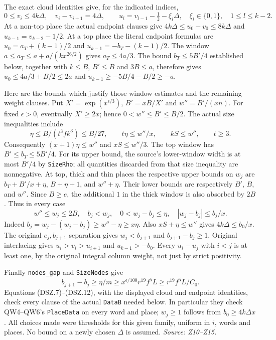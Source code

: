 The exact cloud identities give, for the indicated indices,
\[
 0\le v_i\le4k\Delta,\quad v_i-v_{i+1}=4\Delta,
 \qquad u_l=v_{l-1}-\tfrac12-\xi_l\Delta,
 \quad \xi_l\in\{0,1\},\quad1\le l\le k-2.                 \tag{DSZ.9}
\]
At a non-top place the actual endpoint clauses give
$4k\Delta\le u_0-v_0\le8k\Delta$ and
$u_{k-1}=v_{k-2}-1/2$. At a top place the literal endpoint formulas
are $u_0=a_T+(k-1)/2$ and $u_{k-1}=-b_T-(k-1)/2$.
The window $a\le a_T\le a+a/(kx^{26/2})$ gives
$a_T\le4a/3$. The bound $b_T\le5B'/4$ established below,
together with $k\le B$, $B'\le B$ and $3B\le a$, therefore gives
$u_0\le4a/3+B/2\le2a$ and
$u_{k-1}\ge-5B/4-B/2\ge-a$.

Here are the bounds which justify those window estimates and the
remaining weight clauses. Put
$X'=\exp(x^{\epsilon/3})$, $B'=xB/X'$ and $w''=B'/(xn)$.
For fixed $\epsilon>0$, eventually $X'\ge2x$; hence
$0<w''\le B'\le B/2$.
The actual size inequalities include
\[
 \eta\le B/(t^3fk^3)\le B/27,\qquad
 t\eta\le w''/x,\qquad kS\le w'',\qquad t\ge3.
                                                               \tag{DSZ.10}
\]
Consequently $(x+1)\eta\le w''$ and $xS\le w''/3$.
The top window has $B'\le b_T\le5B'/4$.
For its upper bound, the source's lower-window width is at most
$B'/4$ by \texttt{SizeRho}; all quantities discarded from that
size inequality are nonnegative. At top, thick and thin places
the respective upper bounds on $w_j$ are
$b_T+B'/x+\eta$, $B+\eta+1$, and $w''+\eta$.
Their lower bounds are respectively $B'$, $B$, and $w''$.
Since $B\ge e$, the additional $1$ in the thick window is also
absorbed by $2B$. Thus in every case
\[
 w''\le w_j\le2B,\quad b_j<w_j,\quad0<w_j-b_j\le\eta,
 \quad |w_j-b_j|\le b_j/x.                                    \tag{DSZ.11}
\]
Indeed $b_j=w_j-(w_j-b_j)\ge w''-\eta\ge x\eta$.
Also $xS+\eta\le w''$ gives $4k\Delta\le b_0/x$.
The original $e_j,b_{j+1}$ separation gives $w_j<b_{j+1}$ and
$b_{j+1}-b_j\ge1$. Original interlacing gives
$u_i>v_i>u_{i+1}$ and $u_{k-1}>-b_0$.
Every $u_i-u_j$ with $i<j$ is at least one, by the original
integral column weight, not just by strict positivity.

Finally \texttt{nodes\_gap} and \texttt{SizeNodes} give
\[
 b_{j+1}-b_j\ge\eta/m
       \ge x^{\epsilon/100}r^{19}f^5L
       \ge r^{19}f^5L/C_0.                                   \tag{DSZ.12}
\]
Equations (DSZ.7)--(DSZ.12), with the displayed cloud and endpoint
identities, check every clause of the actual \texttt{DataB} needed
below. In particular they check QW4--QW6's \texttt{PlaceData} on
every word and place; $w_j\ge1$ follows from $b_0\ge4k\Delta x$.
All choices made were thresholds for this given family, uniform in
$i$, words and places. No bound on a newly chosen $\Delta$ is assumed.
\emph{Source: Z10--Z15.}

